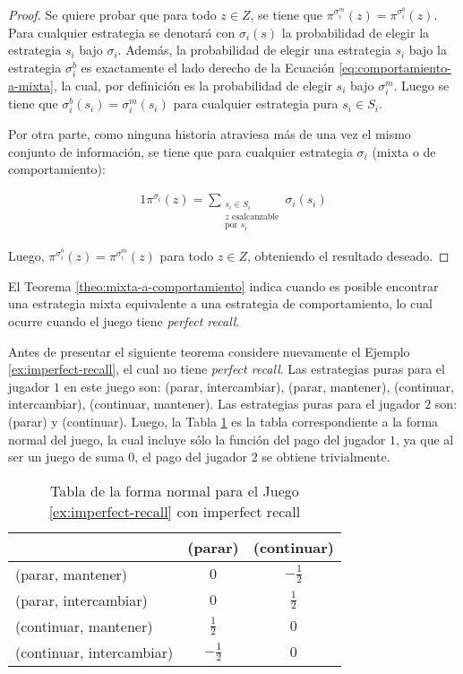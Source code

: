 \begin{proof}
Se quiere probar que para todo $z \in Z$, se tiene que $\pi^{\sigma^m_i}(z) = \pi^{\sigma^b_i}(z)$. 
Para cualquier estrategia se denotará con $\sigma_i(s)$ la probabilidad de elegir la estrategia $s_i$ bajo $\sigma_i$. Además, la probabilidad de elegir una estrategia $s_i$ bajo la estrategia $\sigma^b_i$ es exactamente el lado derecho de la Ecuación \ref{eq:comportamiento-a-mixta}, la cual, por definición es la probabilidad de elegir $s_i$ bajo $\sigma^m_i$. Luego se tiene que $\sigma_i^b(s_i) = \sigma_i^m(s_i)$ para cualquier estrategia pura $s_i \in S_i$.

Por otra parte, como ninguna historia atraviesa más de una vez el mismo conjunto de información, se tiene que para cualquier estrategia $\sigma_i$ (mixta o de comportamiento):

\begin{alignat}{1}
\label{eq:definicion-mixta}
\pi^{\sigma_i}(z) = \sum_{\substack{s_i \in S_i \\  z \text{ es} \text{alcanzable} \\ \text{por } s_i} } \sigma_i(s_i)
\end{alignat}

Luego, $\pi^{\sigma_i^b}(z) = \pi^{\sigma_i^m}(z)$ para todo $z \in Z$, obteniendo el resultado deseado. 
\end{proof}

El Teorema \ref{theo:mixta-a-comportamiento} indica cuando es posible encontrar una estrategia mixta equivalente a una estrategia de comportamiento, lo cual ocurre cuando el juego tiene \textit{perfect recall}.

Antes de presentar el siguiente teorema considere nuevamente el Ejemplo \ref{ex:imperfect-recall}, el cual no tiene \textit{perfect recall}. Las estrategias puras para el jugador $1$ en este juego son: (parar, intercambiar), (parar, mantener), (continuar, intercambiar), (continuar, mantener). Las estrategias puras para el jugador $2$ son: (parar) y (continuar). Luego, la Tabla \ref{table:imperfect-recall} es la tabla correspondiente a la forma normal del juego, la cual incluye sólo la función del pago del jugador $1$, ya que al ser un juego de suma $0$, el pago del jugador $2$ se obtiene trivialmente.

\begin{table}[ht]
\begin{center}
\caption[Tabla de la forma normal para un juego con \textit{imperfect recall}]{Tabla de la forma normal para el Juego \ref{ex:imperfect-recall} con imperfect recall}
\label{table:imperfect-recall}
\begin{tabular}{l  c  c }
\hline
& (parar) & (continuar) \\ \hline
(parar,     mantener)     & $0$ & $-\frac{1}{2}$ \\
(parar,     intercambiar) & $0$ & $ \frac{1}{2}$ \\
(continuar, mantener)     & $ \frac{1}{2}$ & $0$ \\
(continuar, intercambiar) & $-\frac{1}{2}$ & $0$ \\ \hline
\end{tabular}
\end{center}
\end{table}

